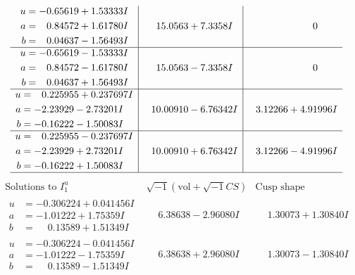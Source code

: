 \documentclass[1p]{elsarticle_modified}
\theoremstyle{definition}
\newcommand{\I}{\sqrt{-1}}
\begin{document}
$$\begin{array}{c|c|c}
\begin{aligned}
u &= -0.65619 + 1.53333 I \\
a &= \phantom{-}0.84572 + 1.61780 I \\
b &= \phantom{-}0.04637 - 1.56493 I\end{aligned}
 & \phantom{-}15.0563 + 7.3358 I & \phantom{-0.000000 } 0 \\ \hline\begin{aligned}
u &= -0.65619 - 1.53333 I \\
a &= \phantom{-}0.84572 - 1.61780 I \\
b &= \phantom{-}0.04637 + 1.56493 I\end{aligned}
 & \phantom{-}15.0563 - 7.3358 I & \phantom{-0.000000 } 0 \\ \hline\begin{aligned}
u &= \phantom{-}0.225955 + 0.237697 I \\
a &= -2.23929 - 2.73201 I \\
b &= -0.16222 - 1.50083 I\end{aligned}
 & \phantom{-}10.00910 - 6.76342 I & \phantom{-}3.12266 + 4.91996 I \\ \hline\begin{aligned}
u &= \phantom{-}0.225955 - 0.237697 I \\
a &= -2.23929 + 2.73201 I \\
b &= -0.16222 + 1.50083 I\end{aligned}
 & \phantom{-}10.00910 + 6.76342 I & \phantom{-}3.12266 - 4.91996 I\\
 \hline 
 \end{array}$$\newpage$$\begin{array}{c|c|c}  
\text{Solutions to }I^u_{1}& \I (\text{vol} + \sqrt{-1}CS) & \text{Cusp shape}\\
 \hline 
\begin{aligned}
u &= -0.306224 + 0.041456 I \\
a &= -1.01222 + 1.75359 I \\
b &= \phantom{-}0.13589 + 1.51349 I\end{aligned}
 & \phantom{-}6.38638 - 2.96080 I & \phantom{-}1.30073 + 1.30840 I \\ \hline\begin{aligned}
u &= -0.306224 - 0.041456 I \\
a &= -1.01222 - 1.75359 I \\
b &= \phantom{-}0.13589 - 1.51349 I\end{aligned}
 & \phantom{-}6.38638 + 2.96080 I & \phantom{-}1.30073 - 1.30840 I \\ \hline\begin{aligned}

\end{aligned}
\end{array}$$
\end{document}
